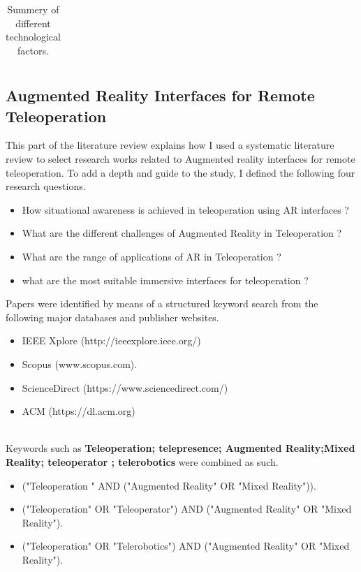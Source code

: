 \begin{longtable}{p{2.5cm} p{5cm} p{5cm} p{1cm}}
\caption{Summery of different technological factors.}
\label{table:tasks}
\end{longtable}

\subsection{Augmented Reality Interfaces for Remote Teleoperation}
This part of the literature review explains how I used a systematic literature review to select research works related to Augmented reality interfaces for remote teleoperation. To add a depth and guide to the study, I defined the following four research questions.

\begin{itemize}
    \item How situational awareness is achieved in teleoperation using AR interfaces ?
    \item What are the different challenges of Augmented Reality in Teleoperation ?
    \item What are the range of applications of AR in Teleoperation ?
    \item what are the most suitable immersive interfaces for teleoperation ?
\end{itemize}

Papers were identified by means of a structured keyword search from the following major databases and publisher websites.

\begin{itemize}
    \item IEEE Xplore (http://ieeexplore.ieee.org/)
    \item Scopus (www.scopus.com).
    \item ScienceDirect (https://www.sciencedirect.com/)
    \item ACM (https://dl.acm.org)
\end{itemize}\\

Keywords such as \textbf{Teleoperation; telepresence; Augmented Reality;Mixed Reality; teleoperator ; telerobotics} were combined as such.
\begin{itemize}
    \item ("Teleoperation " AND ("Augmented Reality" OR "Mixed Reality")).
    \item ("Teleoperation" OR "Teleoperator") AND ("Augmented Reality" OR "Mixed Reality").
    \item ("Teleoperation" OR "Telerobotics") AND ("Augmented Reality" OR "Mixed Reality").
\end{itemize}

